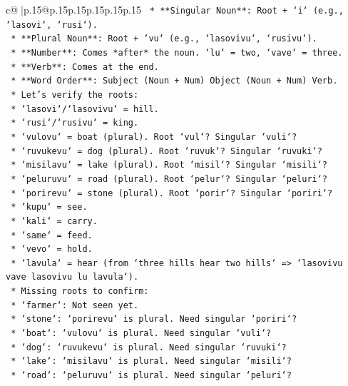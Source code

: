 \documentclass{article}
\begin{document}
{\begin{supertabular}{c@{$\;$}|p{.15\linewidth}@{}p{.15\linewidth}p{.15\linewidth}p{.15\linewidth}p{.15\linewidth}p{.15\linewidth}}
{{{\texttt{        *   **Singular Noun**: Root + `i` (e.g., `lasovi`, `rusi`).} \\
\texttt{        *   **Plural Noun**: Root + `vu` (e.g., `lasovivu`, `rusivu`).} \\
\texttt{        *   **Number**: Comes *after* the noun. `lu` = two, `vave` = three.} \\
\texttt{        *   **Verb**: Comes at the end.} \\
\texttt{        *   **Word Order**: Subject (Noun + Num) Object (Noun + Num) Verb.} \\
\texttt{    *   Let's verify the roots:} \\
\texttt{        *   `lasovi`/`lasovivu` = hill.} \\
\texttt{        *   `rusi`/`rusivu` = king.} \\
\texttt{        *   `vulovu` = boat (plural). Root `vul`? Singular `vuli`?} \\
\texttt{        *   `ruvukevu` = dog (plural). Root `ruvuk`? Singular `ruvuki`?} \\
\texttt{        *   `misilavu` = lake (plural). Root `misil`? Singular `misili`?} \\
\texttt{        *   `peluruvu` = road (plural). Root `pelur`? Singular `peluri`?} \\
\texttt{        *   `porirevu` = stone (plural). Root `porir`? Singular `poriri`?} \\
\texttt{        *   `kupu` = see.} \\
\texttt{        *   `kali` = carry.} \\
\texttt{        *   `same` = feed.} \\
\texttt{        *   `vevo` = hold.} \\
\texttt{        *   `lavula` = hear (from `three hills hear two hills` => `lasovivu vave lasovivu lu lavula`).} \\
\texttt{    *   Missing roots to confirm:} \\
\texttt{        *   `farmer`: Not seen yet.} \\
\texttt{        *   `stone`: `porirevu` is plural. Need singular `poriri`?} \\
\texttt{        *   `boat`: `vulovu` is plural. Need singular `vuli`?} \\
\texttt{        *   `dog`: `ruvukevu` is plural. Need singular `ruvuki`?} \\
\texttt{        *   `lake`: `misilavu` is plural. Need singular `misili`?} \\
\texttt{        *   `road`: `peluruvu` is plural. Need singular `peluri`?} \\
}}}
\end{supertabular}}
\end{document}
